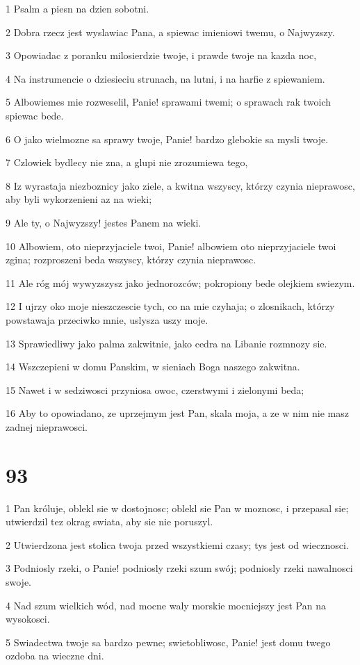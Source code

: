\par 1 Psalm a piesn na dzien sobotni.
\par 2 Dobra rzecz jest wyslawiac Pana, a spiewac imieniowi twemu, o Najwyzszy.
\par 3 Opowiadac z poranku milosierdzie twoje, i prawde twoje na kazda noc,
\par 4 Na instrumencie o dziesieciu strunach, na lutni, i na harfie z spiewaniem.
\par 5 Albowiemes mie rozweselil, Panie! sprawami twemi; o sprawach rak twoich spiewac bede.
\par 6 O jako wielmozne sa sprawy twoje, Panie! bardzo glebokie sa mysli twoje.
\par 7 Czlowiek bydlecy nie zna, a glupi nie zrozumiewa tego,
\par 8 Iz wyrastaja niezboznicy jako ziele, a kwitna wszyscy, którzy czynia nieprawosc, aby byli wykorzenieni az na wieki;
\par 9 Ale ty, o Najwyzszy! jestes Panem na wieki.
\par 10 Albowiem, oto nieprzyjaciele twoi, Panie! albowiem oto nieprzyjaciele twoi zgina; rozproszeni beda wszyscy, którzy czynia nieprawosc.
\par 11 Ale róg mój wywyzszysz jako jednorozców; pokropiony bede olejkiem swiezym.
\par 12 I ujrzy oko moje nieszczescie tych, co na mie czyhaja; o zlosnikach, którzy powstawaja przeciwko mnie, uslysza uszy moje.
\par 13 Sprawiedliwy jako palma zakwitnie, jako cedra na Libanie rozmnozy sie.
\par 14 Wszczepieni w domu Panskim, w sieniach Boga naszego zakwitna.
\par 15 Nawet i w sedziwosci przyniosa owoc, czerstwymi i zielonymi beda;
\par 16 Aby to opowiadano, ze uprzejmym jest Pan, skala moja, a ze w nim nie masz zadnej nieprawosci.

\chapter{93}

\par 1 Pan króluje, oblekl sie w dostojnosc; oblekl sie Pan w moznosc, i przepasal sie; utwierdzil tez okrag swiata, aby sie nie poruszyl.
\par 2 Utwierdzona jest stolica twoja przed wszystkiemi czasy; tys jest od wiecznosci.
\par 3 Podniosly rzeki, o Panie! podniosly rzeki szum swój; podniosly rzeki nawalnosci swoje.
\par 4 Nad szum wielkich wód, nad mocne waly morskie mocniejszy jest Pan na wysokosci.
\par 5 Swiadectwa twoje sa bardzo pewne; swietobliwosc, Panie! jest domu twego ozdoba na wieczne dni.

